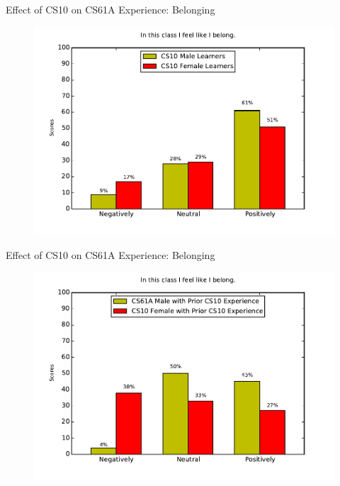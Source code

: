 \documentclass{beamer}                  %
\begin{document}
\begin{frame}{Effect of CS10 on CS61A Experience: Belonging}

  \begin{figure}[!htbp]
      \centering 
      \includegraphics[width=1\textwidth]{blg_1_worstCaseScenario_cs10}
  \end{figure}

\end{frame}

\begin{frame}{Effect of CS10 on CS61A Experience: Belonging}

  \begin{figure}[!htbp]
      \centering 
      \includegraphics[width=1\textwidth]{blg_1_worstCaseScenario}
  \end{figure}

\end{frame}
\end{document}
